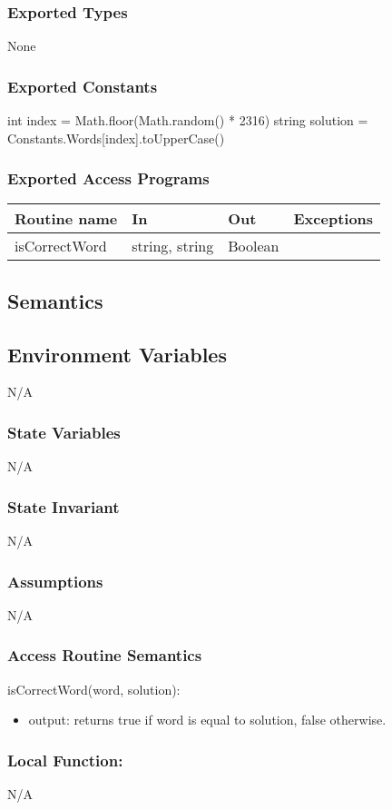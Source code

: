 \documentclass[12pt]{article}
\begin{document}
\subsubsection* {Exported Types}

None

\subsubsection* {Exported Constants}

int index = Math.floor(Math.random() * 2316)
\newline
string solution = Constants.Words[index].toUpperCase()

\subsubsection* {Exported Access Programs}

\begin{tabular}{| l | l | l | p{6cm} |}
\hline
\textbf{Routine name} & \textbf{In} & \textbf{Out} & \textbf{Exceptions}\\
\hline
isCorrectWord & string, string & Boolean &  \\
\hline
\end{tabular}

\subsection* {Semantics}

\subsection*{Environment Variables}
N/A


\subsubsection* {State Variables}
N/A
\subsubsection* {State Invariant}
N/A
\subsubsection* {Assumptions}
N/A

\subsubsection* {Access Routine Semantics}

\noindent isCorrectWord(word, solution):
\begin{itemize}
  \item output: returns true if word is equal to solution, false otherwise.
\end{itemize}

\subsubsection*{Local Function:}

N/A
\end{document}
